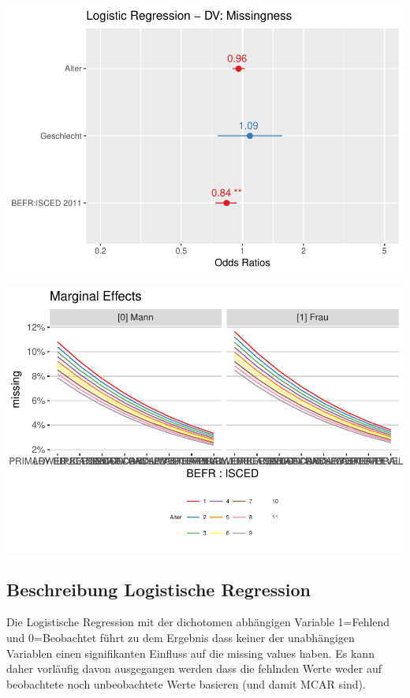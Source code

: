 \documentclass[]{article}
\begin{document}
\begin{center}\includegraphics{ua2_files/figure-latex/unnamed-chunk-2-1} \end{center}

\begin{center}\includegraphics{ua2_files/figure-latex/unnamed-chunk-2-2} \end{center}

\subsection{\texorpdfstring{\textbf{Beschreibung Logistische
Regression}}{Beschreibung Logistische Regression}}\label{beschreibung-logistische-regression}

Die Logistische Regression mit der dichotomen abhängigen Variable
1=Fehlend und 0=Beobachtet führt zu dem Ergebnis dass keiner der
unabhängigen Variablen einen signifikanten Einfluss auf die missing
values haben. Es kann daher vorläufig davon ausgegangen werden dass die
fehlnden Werte weder auf beobachtete noch unbeobachtete Werte basieren
(und damit MCAR sind).
\end{document}
